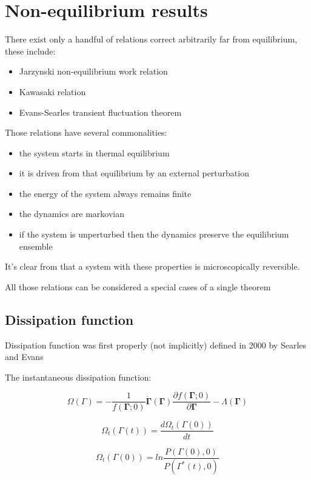 \documentclass[a4paper,12pt,nofootinbib]{article}
\begin{document}
\section{Non-equilibrium results}
There exist only a handful of relations correct arbitrarily far from equilibrium, these include:
\begin{itemize}
  \item Jarzynski non-equilibrium work relation
  \item Kawasaki relation
  \item Evans-Searles transient fluctuation theorem
\end{itemize}
Those relations have several commonalities:
\begin{itemize}
  \item the system starts in thermal equilibrium
  \item it is driven from that equilibrium by an external perturbation
  \item the energy of the system always remains finite
  \item the dynamics are markovian 
  \item if the system is unperturbed then the dynamics preserve the equilibrium ensemble
\end{itemize}
It's clear from that a system with these properties is microscopically reversible.

All those relations can be considered a special cases of a single theorem


\subsection{Dissipation function}

Dissipation function was first properly (not implicitly) defined in 2000 by Searles and Evans 

The instantaneous dissipation function:

\begin{equation}
  \Omega(\Gamma)=-\frac{1}{f(\bm{\Gamma};0)}\dot{\bm{\Gamma}}(\bm{\Gamma})\frac{\partial{f(\bm{\Gamma};0)}}{\partial{\bm{\Gamma}}}-\Lambda(\bm{\Gamma})
\end{equation}


\begin{displaymath}
  \Omega_t(\Gamma(t))=\frac{d \Omega_t(\Gamma(0))}{dt}
\end{displaymath}


\begin{displaymath}
  \Omega_t(\Gamma(0))=ln{\frac{P(\Gamma(0),0)}{P(\Gamma^*(t),0)}}
\end{displaymath}
\end{document}
